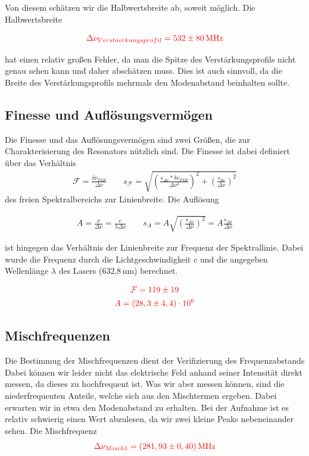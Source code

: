 Von diesem schätzen wir die Halbwertsbreite ab, soweit möglich. Die Halbwertsbreite 

\begin{equation}
    \textcolor{red}{\Delta\nu_{Verstaerkungsprofil} = 532 \pm 80 \, \mathrm{MHz}}
\end{equation}

hat einen relativ großen Fehler, da man die Spitze des Verstärkungsprofils nicht genau sehen kann und daher abschätzen muss.
Dies ist auch sinnvoll, da die Breite des Verstärkungsprofils mehrmals den Modenabstand beinhalten sollte.


\subsection*{Finesse und Auflösungsvermögen}

Die Finesse und das Auflösungsvermögen sind zwei Größen, die zur Charakterisierung des Resonators nützlich sind. Die Finesse ist dabei
definiert über das Verhältnis 
\begin{align}
    \mathcal{F} = \frac{\delta \nu_{FSR}}{\Delta\nu} \qquad s_{\mathcal{F}} = \sqrt{(\frac{s_{\Delta \nu}*\delta \nu_{FSR}}{\Delta\nu^2})^2+(\frac{s_{\delta\nu}}{\Delta \nu})^2}
\end{align}
 des freien Spektralbereichs zur Linienbreite. Die Auflösung 

 \begin{align}
     A = \frac{\nu}{\Delta\nu} = \frac{c}{\lambda\Delta\nu} \qquad s_A = A\sqrt{(\frac{s_{\Delta\nu}}{\Delta\nu})^2} = A\frac{s_{\Delta\nu}}{\Delta\nu}
 \end{align}
 
 ist hingegen das Verhältnis der Linienbreite zur Frequenz der Spektrallinie. Dabei wurde die Frequenz durch
 die Lichtgeschwindigkeit $c$ und die angegeben Wellenlänge $\lambda$ des Lasers (632,8\,nm) berechnet. 
 
 \begin{gather}
    \textcolor{red}{\mathcal{F} = 119\pm19}\\
    \textcolor{red}{A = (28,3\pm4,4)\cdot10^6}
 \end{gather}


 \subsection*{Mischfrequenzen}

 Die Bestimmug der Mischfrequenzen dient der Verifizierung des Frequenzabstands 
 Dabei können wir leider nicht das elektrische Feld anhand seiner Intensität direkt messen, da dieses zu hochfrequent ist. Was wir aber messen können, sind 
 die niederfrequenten Anteile, welche sich aus den Mischtermen ergeben. Dabei erwarten wir in etwa den Modenabstand zu erhalten. 
 Bei der Aufnahme ist es relativ schwierig einen Wert abzulesen, da wir zwei kleine Peaks nebeneinander sehen. Die Mischfrequenz 
 \begin{equation*}
     \textcolor{red}{\Delta \nu_{Misch1} = (281,93\pm0,40)\,\mathrm{MHz} }
 \end{equation*}

